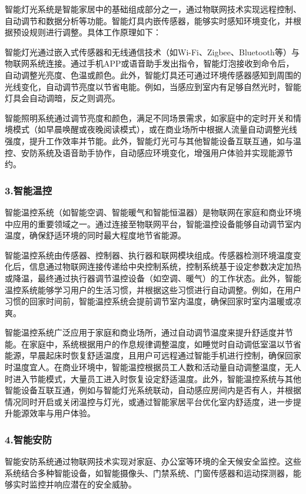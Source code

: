 智能灯光系统是智能家居中的基础组成部分之一，通过物联网技术实现远程控制、自动调节和数据分析等功能。智能灯具内嵌传感器，能够实时感知环境变化，并根据预设规则进行调整。具体工作原理如下：

智能灯光通过嵌入式传感器和无线通信技术（如Wi-Fi、Zigbee、Bluetooth等）与物联网系统连接。通过手机APP或语音助手发出指令，智能灯泡接收到命令后，自动调整光亮度、色温或颜色。此外，智能灯具还可通过环境传感器感知到周围的光线变化，自动调节亮度以节省电能。例如，当感应到室内有足够自然光时，智能灯具会自动调暗，反之则调亮。

智能照明系统通过调节亮度和颜色，满足不同场景需求，如家庭中的定时开关和情境模式（如早晨唤醒或夜晚阅读模式），或在商业场所中根据人流量自动调整光线强度，提升工作效率并节能。此外，智能灯光可与其他智能设备互联互通，如与温控、安防系统及语音助手协作，自动感应环境变化，增强用户体验并实现能源节约。

\subsubsection{3.智能温控}

智能温控系统（如智能空调、智能暖气和智能恒温器）是物联网在家庭和商业环境中应用的重要领域之一。通过连接至物联网平台，智能温控设备能够自动调节室内温度，确保舒适环境的同时最大程度地节省能源。

智能温控系统由传感器、控制器、执行器和联网模块组成。传感器检测环境温度变化后，信息通过物联网连接传递给中央控制系统，控制系统基于设定参数决定加热或降温，最终通过执行器调节温控设备（如空调、暖气）的工作状态。此外，智能温控系统能够学习用户的生活习惯，并根据这些习惯进行自动调整。例如，在用户习惯的回家时间前，智能温控系统会提前调节室内温度，确保回家时室内温暖或凉爽。

智能温控系统广泛应用于家庭和商业场所，通过自动调节温度来提升舒适度并节能。在家庭中，系统根据用户的作息规律调整温度，如睡觉时自动调低室温以节省能源，早晨起床时恢复舒适温度，且用户可远程通过智能手机进行控制，确保回家时温度宜人。在商业环境中，智能温控根据员工人数和活动量自动调整温度，无人时进入节能模式，大量员工进入时恢复设定舒适温度。此外，智能温控系统与其他智能设备互联互通，例如与智能灯光系统联动，自动感应房间内是否有人，并根据情况同时开启或关闭温控与灯光，或通过智能家居平台优化室内舒适度，进一步提升能源效率与用户体验。

\subsubsection{4.智能安防}

智能安防系统通过物联网技术实现对家庭、办公室等环境的全天候安全监控。这些系统结合多种智能设备，如智能摄像头、门禁系统、门窗传感器和运动探测器，能够实时监控并响应潜在的安全威胁。

